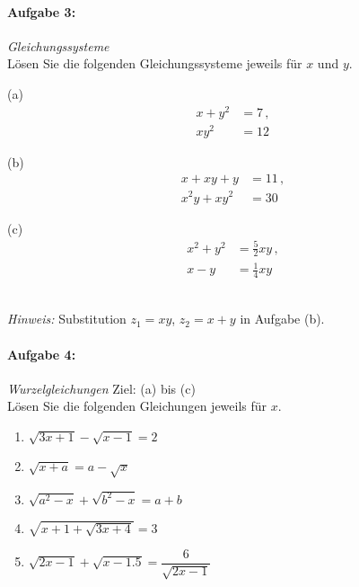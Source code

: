 \paragraph{Aufgabe 3: } \emph{Gleichungssysteme}\\[0.2cm]
Lösen Sie die folgenden Gleichungssysteme jeweils für $x$ und $y$.\\[0.2cm]
\begin{minipage}[t]{0.25\linewidth}
(a)\vspace{-2.6em}
\begin{align*}
x+y^2&=7\,,\\ xy^2&=12
\end{align*}
\end{minipage}\hspace{0.05\linewidth}
\begin{minipage}[t]{0.3\linewidth}
(b)\vspace{-2.6em}
\begin{align*}
x+xy+y&=11\,,\\ x^2y+xy^2&=30
\end{align*}
\end{minipage}\hspace{0.05\linewidth}
\begin{minipage}[t]{0.3\linewidth}
    (c)\vspace{-2.8em}
\begin{align*}
x^2+y^2&=\frac{5}{2}xy\,,\\ x-y&=\frac{1}{4}xy
\end{align*}
\end{minipage}\\
\emph{Hinweis:} Substitution $z_1=xy$, $z_2=x+y$ in Aufgabe (b).

\paragraph{Aufgabe 4: } \emph{Wurzelgleichungen} \hfill Ziel: (a) bis (c)\\[0.2cm]
Lösen Sie die folgenden Gleichungen jeweils für $x$.
\begin{enumerate}[label=(\alph*)]
    \item $\sqrt{3x+1}-\sqrt{x-1}=2$
    \item $\sqrt{x+a}=a-\sqrt{x}$
    \item $\sqrt{a^2-x}+\sqrt{b^2-x}=a+b$
    \item $\sqrt{x+1+\sqrt{3x+4}}=3$
    \item $\sqrt{2x-1}+\sqrt{x-\num{1,5}}=\dfrac{6}{\sqrt{2x-1}}$
\end{enumerate}
%
